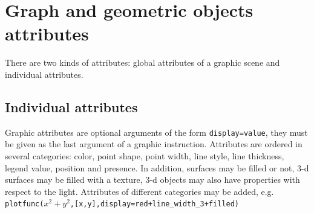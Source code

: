\documentclass[a4paper,11pt]{book}
\begin{document}
\section{Graph and geometric objects attributes}
There are two kinds of attributes: global attributes of a graphic
scene and individual attributes. 

\subsection{Individual attributes}
Graphic attributes are optional arguments of the
form {\tt display=value}, they must be given
as the last argument of a graphic instruction. Attributes
are ordered in several categories: color, point shape, point width,
line style, line thickness, legend value, position and presence. 
In addition, surfaces may be filled or not, 3-d surfaces
may be filled with a texture, 3-d objects may also have properties
with respect to the light. 
Attributes of different categories
may be added, e.g. \\
{\tt plotfunc($x^2+y^2$,[x,y],display=red+line\_width\_3+filled)}
\end{document}
